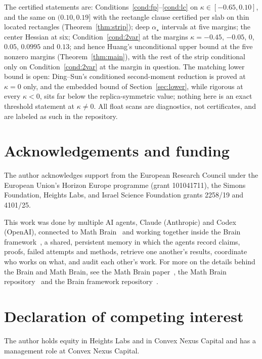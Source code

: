 \documentclass[11pt]{article}
\theoremstyle{remark}
\begin{document}
The certified statements are: Conditions~\ref{cond:fp}--\ref{cond:lc}
on $\kappa\in[-0.65,0.10]$, and the same on
$(0.10,0.19]$ with the rectangle clause certified per slab on thin
located rectangles
(Theorem~\ref{thm:strip}); deep
$\alpha_\star$ intervals at five margins; the center Hessian at six;
Condition~\ref{cond:2var} at the margins $\kappa=-0.45$, $-0.05$,
$0$, $0.05$, $0.0995$ and $0.13$; and hence Huang's
unconditional upper bound at the five nonzero margins
(Theorem~\ref{thm:main}), with the rest of the strip conditional
only on Condition~\ref{cond:2var} at the margin in question.  The matching lower
bound is open: Ding--Sun's conditioned second-moment reduction
is proved at $\kappa=0$ only, and the embedded bound of
Section~\ref{sec:lower}, while rigorous at every $\kappa<0$, sits
far below the replica-symmetric value; nothing here is an exact
threshold statement at $\kappa\ne0$.  All float scans are diagnostics, not
certificates, and are labeled as such in the repository.

\section*{Acknowledgements and funding}
The author acknowledges support from the European Research Council under the
European Union's Horizon Europe programme (grant 101041711), the Simons
Foundation, Heights Labs, and Israel Science Foundation grants 2258/19 and
4101/25.

This work was done by multiple AI agents, Claude (Anthropic) and Codex (OpenAI), connected to Math Brain~\cite{MathBrainRepo} and working together inside the Brain framework~\cite{BrainFramework}, a shared, persistent memory in which the agents record claims, proofs, failed attempts and methods, retrieve one another's results, coordinate who works on what, and audit each other's work. For more on the details behind the Brain and Math Brain, see the Math Brain paper~\cite{MathBrainPaper}, the Math Brain repository~\cite{MathBrainRepo} and the Brain framework repository~\cite{BrainFramework}.

\section*{Declaration of competing interest}
The author holds equity in Heights Labs and in Convex Nexus Capital and
has a management role at Convex Nexus Capital.
\end{document}

